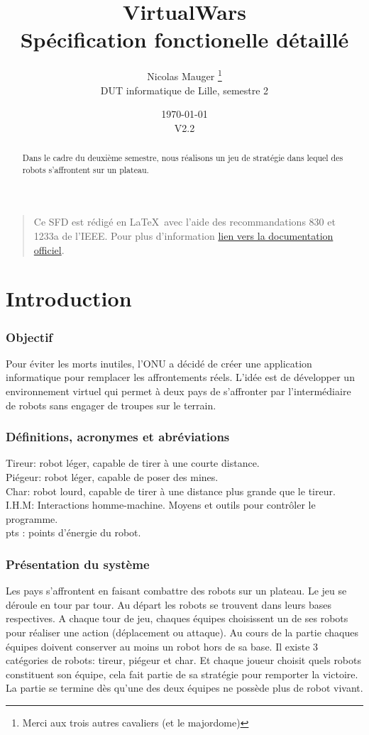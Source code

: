 \documentclass[12pt,a4paper]{article}
\title{VirtualWars \\Spécification fonctionelle détaillé}
\author{Nicolas Mauger \thanks{Merci aux trois autres cavaliers (et le majordome)}
\\DUT informatique de Lille, semestre 2}
\date{\today \\V2.2}
\begin{document}
\maketitle \newpage

\tableofcontents \newpage

\begin{abstract}
Dans le cadre du deuxième semestre, nous réalisons un jeu de stratégie dans lequel des robots s'affrontent sur un plateau.
\end{abstract}

\begin{quotation}
Ce SFD est rédigé en \LaTeX\ avec l'aide des recommandations 830 et 1233a de l'IEEE. Pour plus d'information \href{http://www.math.uaa.alaska.edu/~afkjm/cs401/IEEE83.pdf}{lien vers la documentation  officiel}.
\end{quotation}

\part{Introduction}
		\section{Objectif}
			Pour éviter les morts inutiles, l'ONU a décidé de créer une application informatique pour remplacer les affrontements réels. L'idée est de développer un environnement virtuel qui permet à deux pays de s'affronter par l'intermédiaire de robots sans engager de troupes sur le terrain.
		\section{Définitions, acronymes et abréviations}
			\noindent
			Tireur: robot léger, capable de tirer à une courte distance. \\
			Piégeur: robot léger, capable de poser des mines. \\
			Char: robot lourd, capable de tirer à une distance plus grande que le tireur. \\
			I.H.M: Interactions homme-machine. Moyens et outils pour contrôler le programme.	\\
			pts : points d'énergie du robot.
			\indent
		\section{Présentation du système}
			Les pays s'affrontent en faisant combattre des robots sur un plateau. Le jeu se déroule en tour par tour. Au départ les robots se trouvent dans leurs bases respectives. A chaque tour de jeu, chaques équipes choisissent un de ses robots pour réaliser une action (déplacement ou attaque). Au cours de la partie chaques équipes doivent conserver au moins un robot hors de sa base. Il existe 3 catégories de robots: tireur, piégeur et char. Et chaque joueur choisit quels robots constituent son équipe, cela fait partie de sa stratégie pour remporter la victoire. La partie se termine dès qu'une des deux équipes ne possède plus de robot vivant.
\end{document}
